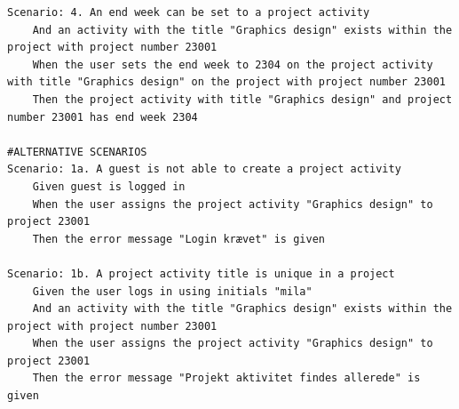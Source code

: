 \begin{listing}[H]
\begin{verbatim}
Scenario: 4. An end week can be set to a project activity
    And an activity with the title "Graphics design" exists within the project with project number 23001
    When the user sets the end week to 2304 on the project activity with title "Graphics design" on the project with project number 23001
    Then the project activity with title "Graphics design" and project number 23001 has end week 2304

#ALTERNATIVE SCENARIOS
Scenario: 1a. A guest is not able to create a project activity
    Given guest is logged in
    When the user assigns the project activity "Graphics design" to project 23001
    Then the error message "Login krævet" is given

Scenario: 1b. A project activity title is unique in a project
    Given the user logs in using initials "mila"
    And an activity with the title "Graphics design" exists within the project with project number 23001
    When the user assigns the project activity "Graphics design" to project 23001
    Then the error message "Projekt aktivitet findes allerede" is given
    \end{verbatim}
\end{listing}
